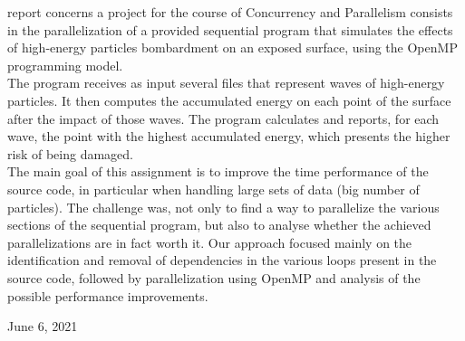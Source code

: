 \documentclass[10pt,journal,compsoc]{IEEEtran}
\begin{document}
% 
% 
% 
% 
 report concerns a project for the course of Concurrency and Parallelism consists in the parallelization of a provided sequential program that simulates the effects of high-energy particles bombardment on an exposed surface, using the OpenMP programming model.\\
The program receives as input several files that represent waves of high-energy particles. It then computes the accumulated energy on each point of the surface after the impact of those waves. The program calculates and reports, for each wave, the point with the highest accumulated energy, which presents the higher risk of being damaged.\\
The main goal of this assignment is to improve the time performance of the source code, in particular when handling large sets of data (big number of particles). The challenge was, not only to find a way to parallelize the various sections of the sequential program, but also to analyse whether the achieved parallelizations are in fact worth it.
Our approach focused mainly on the identification and removal of dependencies in the various loops present in the source code, followed by parallelization using OpenMP and analysis of the possible performance improvements.


 
\hfill June 6, 2021



\end{document}
